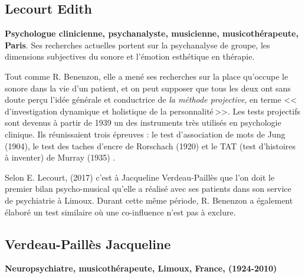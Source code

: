         \subsection{Lecourt Edith}
      \textbf{Psychologue clinicienne,
          psychanalyste, musicienne, musicothérapeute, Paris}. Ses recherches
        actuelles portent sur la psychanalyse de groupe, les
        dimensions subjectives du sonore  et l'émotion esthétique en
        thérapie.

   Tout comme R. Benenzon, elle a mené ses recherches sur la place qu'occupe le sonore dans la vie d'un
        patient, et on peut supposer que tous les deux ont sans doute perçu l'idée générale et
        conductrice de \emph{la méthode projective},
        en terme
	    <<\,d'investigation dynamique et holistique de la
            personnalité\,>>.
            Les tests projectifs sont devenus à partir
        de 1939 un des instruments très utilisés en psychologie
        clinique. Ils réunissaient trois épreuves : le test
        d'association de mots de Jung (1904), le test des taches
        d'encre de Rorschach (1920) et le TAT (test d'histoires à
        inventer) de Murray (1935) \autocite[ch.~1, p.~13] {anzieu.chabert:methodes}.

        Selon E. Lecourt,
(2017)\autocite[ch.~3, p.~84]{lecourt_les_2017}
c'est à Jacqueline Verdeau-Paillès que l'on doit le premier bilan
psycho-musical qu'elle a réalisé avec ses patients dans son service
de psychiatrie à Limoux. Durant cette même période, R.
Benenzon a également élaboré un test similaire
\autocite{benenzon:musicotherapie} où une co-influence n'est pas à exclure.





\subsection{Verdeau-Paillès Jacqueline
}
\textbf{Neuropsychiatre,
  musicothérapeute, Limoux, France, (1924-2010)}

